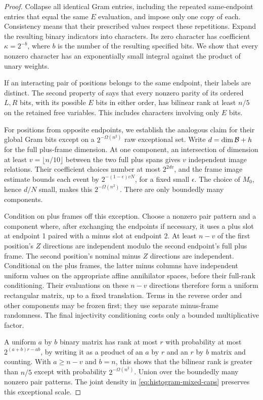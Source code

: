 \begin{proof}
Collapse all identical Gram entries, including the repeated
same-endpoint entries that equal the same $E$ evaluation, and impose
only one copy of each. Consistency means that their prescribed values
respect these repetitions. Expand the resulting binary indicators
into characters. Its zero character has coefficient $\kappa=2^{-b}$,
where $b$ is the number of the resulting specified bits. We show that
every nonzero character has an exponentially small integral against
the product of unary weights.

If an interacting pair of positions belongs to the same endpoint,
their labels are distinct. The second property of
 says that every nonzero parity of its ordered
$L,R$ bits, with its possible $E$ bits in either order, has bilinear
rank at least $n/5$ on the retained free variables. This includes
characters involving only $E$ bits.

For positions from opposite endpoints, we establish the analogous
claim for their global Gram bits except on a
$2^{-\Omega(n^2)}$ raw exceptional set. Write $d=\dim\mathcal B+h$ for the
full plus-frame dimension. At one component, an intersection of
dimension at least $v=\lfloor n/10\rfloor$ between the two full plus
spans gives $v$ independent image relations. Their coefficient
choices number at most $2^{2dv}$, and the frame image estimate bounds
each event by $2^{-(1-\epsilon)vN}$, for a fixed small $\epsilon$.
The choice of $M_0$, hence $d/N$ small, makes this
$2^{-\Omega(n^2)}$. There are only boundedly many components.

Condition on plus frames off this exception. Choose a nonzero pair
pattern and a component where, after exchanging the endpoints if
necessary, it uses a plus slot at endpoint 1 paired with a minus slot
at endpoint 2. At least $n-v$ of the first position's $Z$ directions
are independent modulo the second endpoint's full plus frame. The
second position's nominal minus $Z$ directions are independent.
Conditional on the plus frames, the latter minus columns have
independent uniform values on the appropriate affine annihilator
spaces, before their full-rank conditioning. Their evaluations on
these $n-v$ directions therefore form a uniform rectangular matrix,
up to a fixed translation. Terms in the reverse order and other
components may be frozen first; they use separate minus-frame
randomness. The final injectivity conditioning costs only a bounded
multiplicative factor.

A uniform $a$ by $b$ binary matrix has rank at most $r$ with
probability at most $2^{(a+b)r-ab}$, by writing it as a product of an
$a$ by $r$ and an $r$ by $b$ matrix and counting. With
$a\ge n-v$ and $b=n$, this shows that the bilinear rank is greater
than $n/5$ except with probability $2^{-\Omega(n^2)}$. Union over the
boundedly many nonzero pair patterns. The joint density in
\eqref{eq:histogram-mixed-caps} preserves this exceptional scale.


\end{proof}
